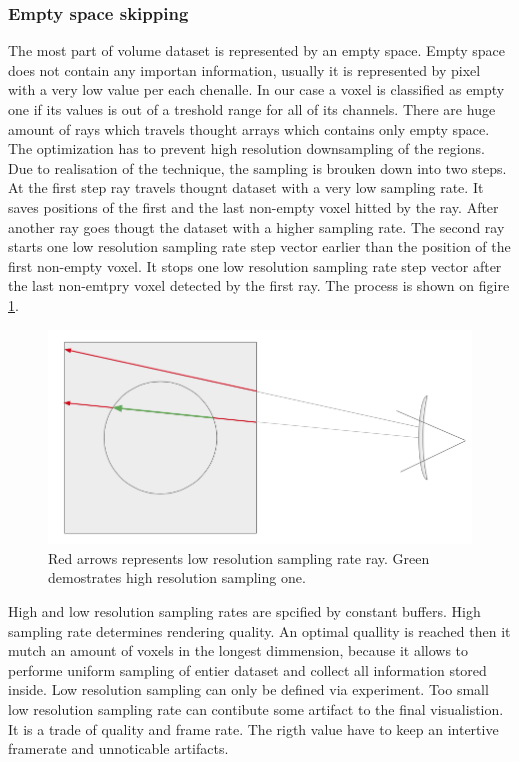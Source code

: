 \documentclass[twoside, english, 11pt]{report}
\begin{document}
\subsubsection{Empty space skipping}

The most part of volume dataset is represented by an empty space. Empty space does not contain any importan information, usually it is represented by pixel with a very low value per each chenalle. In our case a voxel is classified as empty one if its values is out of a treshold range for all of its channels. There are huge amount of rays which travels thought arrays which contains only empty space. The optimization has to prevent high resolution downsampling of the regions.\\

Due to realisation of the technique, the sampling is brouken down into two steps. At the first step ray travels thougnt dataset with a very low sampling rate. It saves positions of the first and the last non-empty voxel hitted by the ray. After another ray goes thougt the dataset with a higher sampling rate. The second ray starts one low resolution sampling rate step vector earlier than the position of the first non-empty voxel. It stops one low resolution sampling rate step vector after the last non-emtpry voxel detected by the first ray. The process is shown on figire \ref{fig:empty}.\\

\begin{figure}[!h]
\centerline{\includegraphics[scale = 0.5]{img/empty}}
\caption{Red arrows represents low resolution sampling rate ray. Green demostrates high resolution sampling one.\label{fig:empty}}
\end{figure}

High and low resolution sampling rates are spcified by constant buffers. High sampling rate determines rendering quality. An optimal quallity is reached then it mutch an amount of voxels in the longest dimmension, because it allows to performe uniform sampling of entier dataset and collect all information stored inside. Low resolution sampling can only be defined via experiment. Too small low resolution sampling rate can contibute some artifact to the final visualistion. It is a trade of quality and frame rate. The rigth value have to keep an intertive framerate and unnoticable artifacts.
\end{document}
